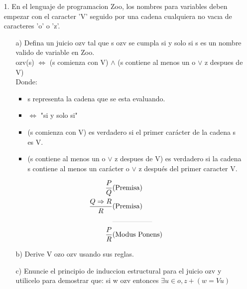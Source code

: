 \documentclass{article}
\begin{document}
    \begin{itemize}
        \item[1.] En el lenguaje de programacion Zoo, los nombres para variables deben empezar con el caracter ’V’ seguido por una cadena cualquiera no vacıa de caracteres ’o’ o ’z’.
            \begin{itemize}
                \item[a)]Defina un juicio ozv tal que s ozv se cumpla si y solo si s es un nombre valido de variable en Zoo.\\
                ozv(s) $\Leftrightarrow$ (s comienza con V) $\land$ (s contiene al menos un o $\lor$ z despues de V)\\
                Donde:\\
                \begin{itemize}
                    \item s representa la cadena que se esta evaluando.
                    \item $\Leftrightarrow$ "si y solo si"
                    \item (s comienza con V) es verdadero si el primer carácter de la cadena s es V.
                    \item (s contiene al menos un o $\lor$ z despues de V) es verdadero si la cadena s contiene al menos un carácter o $\lor$ z después del primer caracter V.
                \end{itemize}

                \begin{align*}
                    \frac{P}{Q} & \text{(Premisa)} \\
                    \frac{Q \Rightarrow R}{R} & \text{(Premisa)}\\
                    &\rule{2cm}{0.1pt}&\\
                    \frac{P}{R}&\text{(Modus Ponens)}
                \end{align*}

                \item[b)] Derive V ozo ozv usando sus reglas.
                \item[c)] Enuncie el principio de induccion estructural para el juicio ozv y utilicelo para demostrar que: si w ozv entonces $\exists u \in {o, z}+ (w = V u)$\\


\end{itemize}
\end{itemize}
\end{document}
